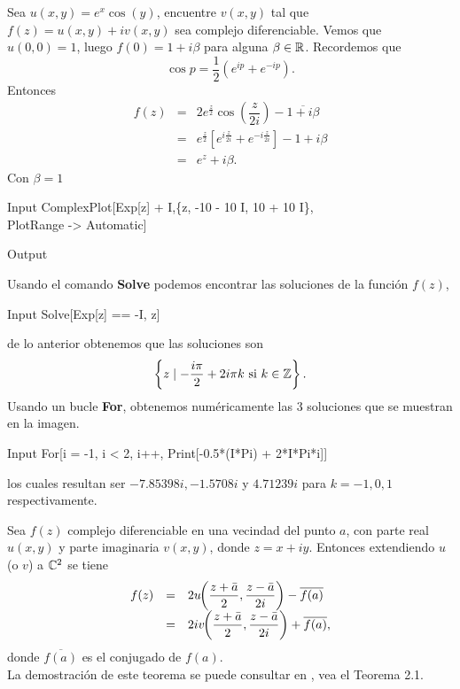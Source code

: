 \begin{Ejem}	
	Sea $u(x,y)=e^{x} \cos(y)$, encuentre $v(x,y)$ tal que $f(z)=u(x,y)+iv(x,y)$ sea complejo diferenciable.
	\solu
	\noindent Vemos que $u(0,0)=1$, luego $f(0)=1+i\beta$ para  alguna $\beta\in\mathbb{R}$. Recordemos que 
	$$\cos p=\dfrac{1}{2}(e^{ip}+e^{-ip}).$$
	Entonces 
	\[
		\begin{array}{ccl}
			f(z)&=&2e^{\frac{z}{2}}\cos\left(\dfrac{z}{2i}\right)-\overline{1+i\beta}\\
			&=&e^{\frac{z}{2}}\left[e^{i\frac{z}{2i}}+e^{-i\frac{z}{2i}} \right]-1+i\beta\\
			&=&e^{z}+i\beta.
		\end{array}
	\]
	Con $\beta=1$
	
	\begin{mmaCell}{Input}
		ComplexPlot[Exp[z] + I,\{z, -10 - 10 I, 10 + 10 I\},\\PlotRange -> Automatic]
	\end{mmaCell}
	
	\begin{mmaCell}[moregraphics={moreig={scale=.25}}]{Output}
	\end{mmaCell}
Usando el comando \textbf{Solve} podemos encontrar las soluciones  de la función $f(z)$,
\begin{mmaCell}{Input}
	 Solve[Exp[z] == -I, z]
\end{mmaCell}
de lo anterior obtenemos que las soluciones son $$\left\{z\mid -\dfrac{i\pi}{2} +2 i \pi  k\text{ si }k\in \mathbb{Z}\right\}.$$
Usando un bucle \textbf{For}, obtenemos numéricamente las 3 soluciones que se muestran en la imagen.
\begin{mmaCell}{Input}
	 For[i = -1, i < 2, i++, Print[-0.5*(I*Pi) + 2*I*Pi*i]]
\end{mmaCell}
los cuales resultan ser $-7.85398 i,  -1.5708 i$ y $4.71239i$ para $k=-1,0,1$ respectivamente.\endproof

\end{Ejem}


\begin{teor}\label{TAS2}
	Sea $f(z)$ complejo diferenciable en una vecindad del punto $a$, con parte real $u(x, y)$ y parte imaginaria $v(x, y)$, donde 
	$z = x + iy$. Entonces extendiendo  $u$ (o $v$) a $\mathbb{C}^2$ se tiene
	\[
	\begin{array}{ccl}
		f(z)&=&2u\hspace{-0.1cm}\left(\dfrac{z+\bar{a}}{2},\dfrac{z-\bar{a}}{2i}\right)-\overline{f(a)}\\
		&=&2iv\hspace{-0.1cm}\left(\dfrac{z+\bar{a}}{2},\dfrac{z-\bar{a}}{2i}\right)+\overline{f(a)},
	\end{array}
	\]
	donde $\overline{f(a)}$ es el conjugado de $f(a)$.\\
		La demostración de este teorema se puede consultar en \cite{Shaw-A}, vea el Teorema 2.1.
\end{teor}



